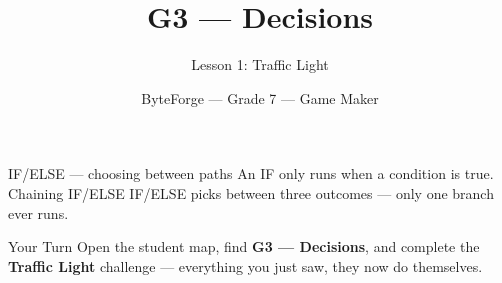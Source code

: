 \documentclass[aspectratio=169]{beamer}
\title{G3 — Decisions}
\subtitle{Lesson 1: Traffic Light}
\author{ByteForge --- Grade 7 --- Game Maker}
\date{}
\begin{document}
\begin{frame}
    \titlepage
\end{frame}

\begin{frame}{IF/ELSE — choosing between paths}
    \Large
    An IF only runs when a condition is true. Chaining IF/ELSE IF/ELSE picks between three outcomes — only one branch ever runs.

    \begin{center}
    \end{center}
\end{frame}

\begin{frame}{Your Turn}
    \Large
    Open the student map, find \textbf{G3 — Decisions}, and complete
    the \textbf{Traffic Light} challenge --- everything you just saw, they now do themselves.
\end{frame}
\end{document}
